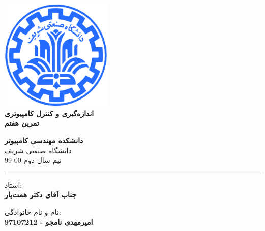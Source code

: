 \documentclass[12pt]{article}
\begin{document}
\begin{titlepage}
\begin{center}
        
\vspace*{0.7cm}

\includegraphics[width=0.4\textwidth]{sharif1.png}\\
\vspace{0.5cm}
\textbf{ \Huge{\emph ‌اندازه‌گیری و کنترل کامپیوتری} }\\
\vspace{0.5cm}
\textbf{ \Large{ تمرین هفتم} }
\vspace{0.2cm}
       
 
      \large \textbf{دانشکده مهندسی کامپیوتر}\\\vspace{0.2cm}
    \large   دانشگاه صنعتی شریف\\\vspace{0.2cm}
       \large   ﻧﯿﻢ سال دوم 00-99 \\\vspace{0.2cm}
      \noindent\rule[1ex]{\linewidth}{1pt}
استاد:\\
    \textbf{{جناب آقای دکتر همت‌یار}}


    \vspace{0.15cm}
نام و نام خانوادگی:\\

       
    \textbf{{امیرمهدی نامجو - 97107212}}
\end{center}
\end{titlepage}


\newpage
\pagestyle{fancy}
\fancyhf{}
\fancyfoot{}
\cfoot{\thepage}
\end{document}
